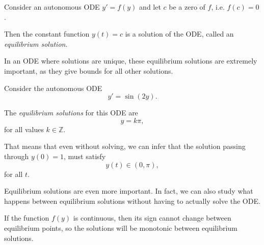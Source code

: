 \begin{important}
Consider an autonomous ODE \quad $y'=f(y)$ \quad and let $c$ be a zero of $f$, i.e. $f(c)=0$.

Then the constant function \quad $y(t) = c$ \quad is a solution of the ODE, called an \emph{equilibrium solution}.
\end{important}


In an ODE where solutions are unique, these equilibrium solutions are extremely important, as they give bounds for all other solutions.


\begin{example}
Consider the autonomous ODE
$$
y'=\sin(2y).
$$

The \emph{equilibrium solutions} for this ODE are
$$
y = k\pi,
$$
for all values $k \in \mathbb{Z}$.

That means that even without solving, we can infer that the solution passing through $y(0)=1$, must satisfy
$$
y(t) \in (0,\pi),
$$
for all $t$.	
\end{example}


Equilibrium solutions are even more important. In fact, we can also study what happens between equilibrium solutions without having to actually solve the ODE.

If the function $f(y)$ is continuous, then its sign cannot change between equilibrium points, so the solutions will be monotonic between equilibrium solutions.

